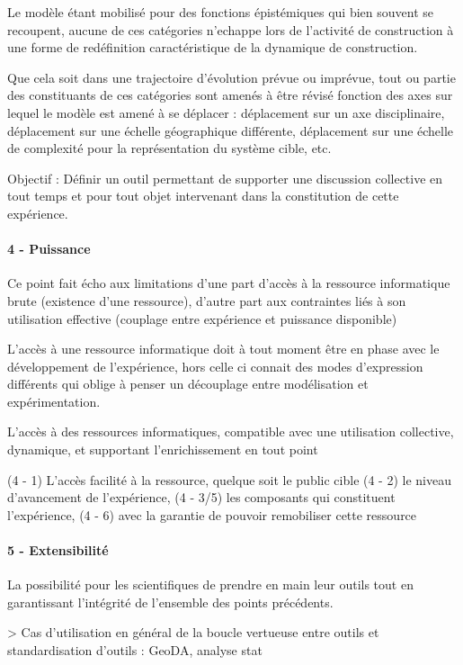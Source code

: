 Le modèle étant mobilisé pour des fonctions épistémiques qui bien souvent se recoupent, aucune de ces catégories n'echappe lors de l'activité de construction à une forme de redéfinition caractéristique de la dynamique de construction. 

Que cela soit dans une trajectoire d'évolution prévue ou imprévue, tout ou partie des constituants de ces catégories sont amenés à être révisé fonction des axes sur lequel le modèle est amené à se déplacer : déplacement sur un axe disciplinaire, déplacement sur une échelle géographique différente, déplacement sur une échelle de complexité pour la représentation du système cible, etc.

Objectif : Définir un outil permettant de supporter une discussion collective en tout temps et pour tout objet intervenant dans la constitution de cette expérience. 

\paragraph{4 - Puissance}

Ce point fait écho aux limitations d'une part d'accès à la ressource informatique brute (existence d'une ressource), d'autre part aux contraintes liés à son utilisation effective (couplage entre expérience et puissance disponible)

L'accès à une ressource informatique doit à tout moment être en phase avec le développement de l'expérience, hors celle ci connait des modes d'expression différents qui oblige à penser un découplage entre modélisation et expérimentation.

L'accès à des ressources informatiques, compatible avec une utilisation collective, dynamique, et supportant l'enrichissement en tout point

(4 - 1) L'accès facilité à la ressource, quelque soit le public cible
(4 - 2) le niveau d'avancement de l'expérience,
(4 - 3/5) les composants qui constituent l'expérience,
(4 - 6) avec la garantie de pouvoir remobiliser cette ressource 


\paragraph{5 - Extensibilité}

La possibilité pour les scientifiques de prendre en main leur outils tout en garantissant l'intégrité de l'ensemble des points précédents.


> Cas d'utilisation en général de la boucle vertueuse entre outils et standardisation d'outils : GeoDA, analyse stat

